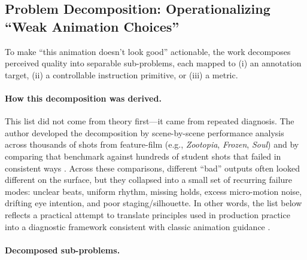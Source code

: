 \documentclass[11pt,a4paper]{article}
\begin{document}
\subsection{Problem Decomposition: Operationalizing ``Weak Animation Choices''}

To make ``this animation doesn't look good'' actionable, the work decomposes perceived quality into separable sub-problems, each mapped to (i) an annotation target, (ii) a controllable instruction primitive, or (iii) a metric.

\paragraph{How this decomposition was derived.}
This list did not come from theory first---it came from repeated diagnosis. The author developed the decomposition by scene-by-scene performance analysis across thousands of shots from feature-film (e.g., \textit{Zootopia}, \textit{Frozen}, \textit{Soul}) and by comparing that benchmark against hundreds of student shots that failed in consistent ways \citep{buck2013frozen, docter2020soul, howard2016zootopia}. Across these comparisons, different ``bad'' outputs often looked different on the surface, but they collapsed into a small set of recurring failure modes: unclear beats, uniform rhythm, missing holds, excess micro-motion noise, drifting eye intention, and poor staging/silhouette. In other words, the list below reflects a practical attempt to translate principles used in production practice into a diagnostic framework consistent with classic animation guidance \citep{thomas1995illusion, williams2009animator}.

\paragraph{Decomposed sub-problems.}
\end{document}
